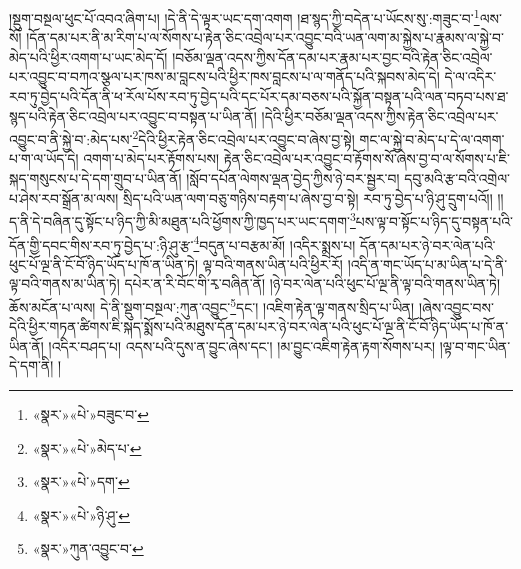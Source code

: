 །སྡུག་བསྔལ་ཕུང་པོ་འབའ་ཞིག་པ། །དེ་ནི་དེ་ལྟར་ཡང་དག་འགག །ཐ་སྙད་ཀྱི་བདེན་པ་ཡོངས་སུ་:གཟུང་བ་\footnote{«སྣར་»«པེ་»བཟུང་བ་}ལས་སོ། །དོན་དམ་པར་ནི་མ་རིག་པ་ལ་སོགས་པ་རྟེན་ཅིང་འབྲེལ་པར་འབྱུང་བའི་ཡན་ལག་མ་སྐྱེས་པ་རྣམས་ལ་སྐྱེ་བ་མེད་པའི་ཕྱིར་འགག་པ་ཡང་མེད་དོ། །བཅོམ་ལྡན་འདས་ཀྱིས་དོན་དམ་པར་རྣམ་པར་བྱང་བའི་རྟེན་ཅིང་འབྲེལ་པར་འབྱུང་བ་བཀའ་སྩལ་པར་ཁས་མ་བླངས་པའི་ཕྱིར་ཁས་བླངས་པ་ལ་གནོད་པའི་སྐབས་མེད་དེ། དེ་ལ་འདིར་རབ་ཏུ་བྱེད་པའི་དོན་ནི་ཕ་རོལ་པོས་རབ་ཏུ་བྱེད་པའི་དང་པོར་དམ་བཅས་པའི་སྐྱོན་བསྟན་པའི་ལན་བཏབ་པས་ཐ་སྙད་པའི་རྟེན་ཅིང་འབྲེལ་པར་འབྱུང་བ་བསྟན་པ་ཡིན་ནོ། །དེའི་ཕྱིར་བཅོམ་ལྡན་འདས་ཀྱིས་རྟེན་ཅིང་འབྲེལ་པར་འབྱུང་བ་ནི་སྐྱེ་བ་:མེད་པས་\footnote{«སྣར་»«པེ་»མེད་པ་}དེའི་ཕྱིར་རྟེན་ཅིང་འབྲེལ་པར་འབྱུང་བ་ཞེས་བྱ་སྟེ། གང་ལ་སྐྱེ་བ་མེད་པ་དེ་ལ་འགག་པ་ག་ལ་ཡོད་དེ། འགག་པ་མེད་པར་རྟོགས་པས། རྟེན་ཅིང་འབྲེལ་པར་འབྱུང་བ་རྟོགས་སོ་ཞེས་བྱ་བ་ལ་སོགས་པ་ཇི་སྐད་གསུངས་པ་དེ་དག་གྲུབ་པ་ཡིན་ནོ། །སློབ་དཔོན་ལེགས་ལྡན་བྱེད་ཀྱིས་ཉེ་བར་སྦྱར་བ། དབུ་མའི་རྩ་བའི་འགྲེལ་པ་ཤེས་རབ་སྒྲོན་མ་ལས། སྲིད་པའི་ཡན་ལག་བཅུ་གཉིས་བརྟག་པ་ཞེས་བྱ་བ་སྟེ། རབ་ཏུ་བྱེད་པ་ཉི་ཤུ་དྲུག་པའོ།། །།ད་ནི་དེ་བཞིན་དུ་སྟོང་པ་ཉིད་ཀྱི་མི་མཐུན་པའི་ཕྱོགས་ཀྱི་ཁྱད་པར་ཡང་དགག་\footnote{«སྣར་»«པེ་»དག་}པས་ལྟ་བ་སྟོང་པ་ཉིད་དུ་བསྟན་པའི་དོན་གྱི་དབང་གིས་རབ་ཏུ་བྱེད་པ་:ཉི་ཤུ་རྩ་\footnote{«སྣར་»«པེ་»ཉི་ཤུ་}བདུན་པ་བརྩམ་མོ། །འདིར་སྨྲས་པ། དོན་དམ་པར་ཉེ་བར་ལེན་པའི་ཕུང་པོ་ལྔ་ནི་ངོ་བོ་ཉིད་ཡོད་པ་ཁོ་ན་ཡིན་ཏེ། ལྟ་བའི་གནས་ཡིན་པའི་ཕྱིར་རོ། །འདི་ན་གང་ཡོད་པ་མ་ཡིན་པ་དེ་ནི་ལྟ་བའི་གནས་མ་ཡིན་ཏེ། དཔེར་ན་རི་བོང་གི་རྭ་བཞིན་ནོ། །ཉེ་བར་ལེན་པའི་ཕུང་པོ་ལྔ་ནི་ལྟ་བའི་གནས་ཡིན་ཏེ། ཆོས་མངོན་པ་ལས། དེ་ནི་སྡུག་བསྔལ་:ཀུན་འབྱུང་\footnote{«སྣར་»ཀུན་འབྱུང་བ་}དང་། །འཇིག་རྟེན་ལྟ་གནས་སྲིད་པ་ཡིན། །ཞེས་འབྱུང་བས་དེའི་ཕྱིར་གཏན་ཚིགས་ཇི་སྐད་སྨོས་པའི་མཐུས་དོན་དམ་པར་ཉེ་བར་ལེན་པའི་ཕུང་པོ་ལྔ་ནི་ངོ་བོ་ཉིད་ཡོད་པ་ཁོ་ན་ཡིན་ནོ། །འདིར་བཤད་པ། འདས་པའི་དུས་ན་བྱུང་ཞེས་དང་། །མ་བྱུང་འཇིག་རྟེན་རྟག་སོགས་པར། །ལྟ་བ་གང་ཡིན་དེ་དག་ནི། །
